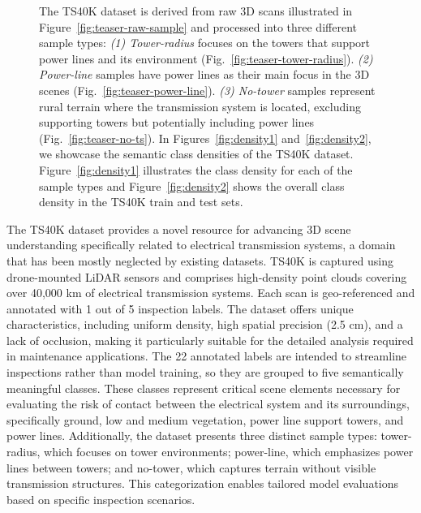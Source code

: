 \begin{figure*}[t]
\caption{The TS40K dataset is derived from raw 3D scans illustrated in Figure~\ref{fig:teaser-raw-sample} and processed into three different sample types: \textit{(1) Tower-radius} focuses on the towers that support power lines and its environment (Fig.~\ref{fig:teaser-tower-radius}). \textit{(2) Power-line} samples have power lines as their main focus in the 3D scenes (Fig.~\ref{fig:teaser-power-line}). \textit{(3) No-tower} samples represent rural terrain where the transmission system is located, excluding supporting towers but potentially including power lines (Fig.~\ref{fig:teaser-no-ts}).
%
In Figures~\ref{fig:density1} and~\ref{fig:density2}, we showcase the semantic class densities of the TS40K dataset. Figure~\ref{fig:density1} illustrates the class density for each of the sample types and Figure~\ref{fig:density2} shows the overall class density in the TS40K train and test sets.}
\label{fig:teaser}
\end{figure*}


The TS40K dataset provides a novel resource for advancing 3D scene understanding specifically related to electrical transmission systems, a domain that has been mostly neglected by existing datasets. 
%
TS40K is captured using drone-mounted LiDAR sensors and comprises high-density point clouds covering over 40,000 km of electrical transmission systems. Each scan is geo-referenced and annotated with 1 out of 5 inspection labels. 
%
The dataset offers unique characteristics, including uniform density, high spatial precision (2.5 cm), and a lack of occlusion, making it particularly suitable for the detailed analysis required in maintenance applications.
%
The 22 annotated labels are intended to streamline inspections rather than model training, so they are grouped to five semantically meaningful classes. These classes represent critical scene elements necessary for evaluating the risk of contact between the electrical system and its surroundings, specifically ground, low and medium vegetation, power line support towers, and power lines.
%
Additionally, the dataset presents three distinct sample types: tower-radius, which focuses on tower environments; power-line, which emphasizes power lines between towers; and no-tower, which captures terrain without visible transmission structures. This categorization enables tailored model evaluations based on specific inspection scenarios.

